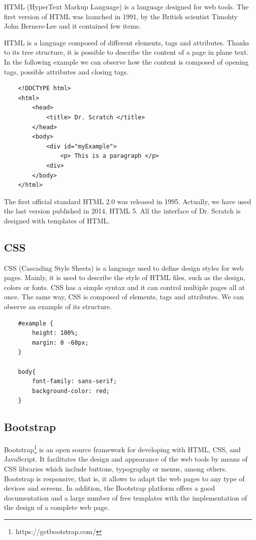 HTML (HyperText Markup Language) is a language designed for web tools. The first version of HTML was launched in 1991, by the British scientist Timohty John Berners-Lee and it contained few items. 

HTML is a language composed of different elements, tags and attributes. Thanks to its tree structure, it is possible to describe the content of a page in plane text. In the following example we can observe how the content is composed of opening tags, possible attributes and closing tags. 

{\footnotesize
\begin{verbatim}
    <!DOCTYPE html>
    <html>
        <head>
            <title> Dr. Scratch </title>
        </head>
        <body>
            <div id="myExample">
                <p> This is a paragraph </p>
            <div>
        </body>
    </html>        
\end{verbatim}
}

The first official standard HTML 2.0 was released in 1995. Actually, we have used the last version published in 2014, HTML 5. All the interface of Dr. Scratch is designed with templates of HTML.


\subsection{CSS}
\label{subsec:css}

CSS (Cascading Style Sheets) is a language used to define design styles for web pages. Mainly, it is used to describe the style of HTML files, such as the design, colors or fonts. CSS has a simple syntax and it can control multiple pages all at once. The same way, CSS is composed of elements, tags and attributes. We can observe an example of its structure.  

{\footnotesize
\begin{verbatim}
    #example {
        height: 100%;
        margin: 0 -60px;
    } 
    
    body{
        font-family: sans-serif;
        background-color: red;
    }
\end{verbatim}
}

\subsection{Bootstrap}
\label{subsec:bootstrap}

Bootstrap\footnote{https://getbootstrap.com/} is an open source framework for developing with HTML, CSS, and JavaScript. It facilitates the design and appearance of the web tools by means of CSS libraries which include buttons, typography or menus, among others. Bootstrap is responsive, that is, it allows to adapt the web pages to any type of devices and screens.
In addition, the Bootstrap platform offers a good documentation and a large number of free templates with the implementation of the design of a complete web page. 


